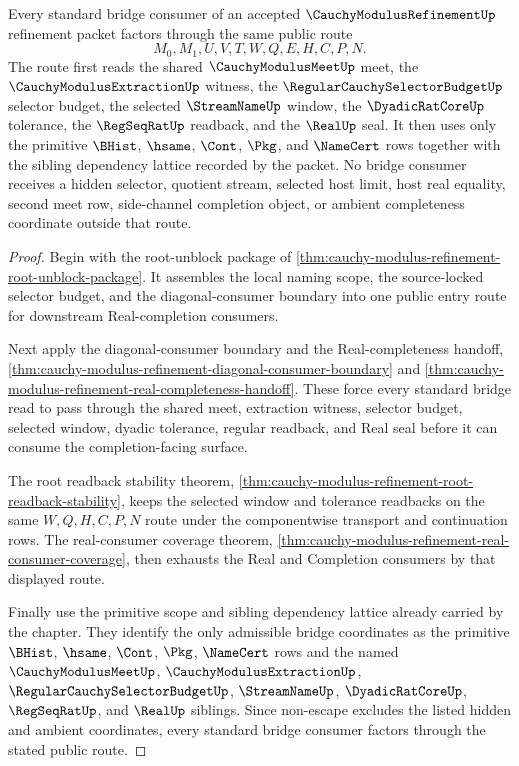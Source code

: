 \begin{theorem}
\label{thm:cauchy-modulus-refinement-bridged-route-surface}
Every standard bridge consumer of an accepted $\CauchyModulusRefinementUp$ refinement packet factors through the same public route
$$
M_0,M_1,U,V,T,W,Q,E,H,C,P,N.
$$
The route first reads the shared $\CauchyModulusMeetUp$ meet, the $\CauchyModulusExtractionUp$ witness, the $\RegularCauchySelectorBudgetUp$ selector budget, the selected $\StreamNameUp$ window, the $\DyadicRatCoreUp$ tolerance, the $\RegSeqRatUp$ readback, and the $\RealUp$ seal. It then uses only the primitive $\BHist$, $\hsame$, $\Cont$, $\Pkg$, and $\NameCert$ rows together with the sibling dependency lattice recorded by the packet. No bridge consumer receives a hidden selector, quotient stream, selected host limit, host real equality, second meet row, side-channel completion object, or ambient completeness coordinate outside that route.
\end{theorem}
\begin{proof}
Begin with the root-unblock package of \autoref{thm:cauchy-modulus-refinement-root-unblock-package}. It assembles the local naming scope, the source-locked selector budget, and the diagonal-consumer boundary into one public entry route for downstream Real-completion consumers.

Next apply the diagonal-consumer boundary and the Real-completeness handoff, \autoref{thm:cauchy-modulus-refinement-diagonal-consumer-boundary} and \autoref{thm:cauchy-modulus-refinement-real-completeness-handoff}. These force every standard bridge read to pass through the shared meet, extraction witness, selector budget, selected window, dyadic tolerance, regular readback, and Real seal before it can consume the completion-facing surface.

The root readback stability theorem, \autoref{thm:cauchy-modulus-refinement-root-readback-stability}, keeps the selected window and tolerance readbacks on the same $W,Q,H,C,P,N$ route under the componentwise transport and continuation rows. The real-consumer coverage theorem, \autoref{thm:cauchy-modulus-refinement-real-consumer-coverage}, then exhausts the Real and Completion consumers by that displayed route.

Finally use the primitive scope and sibling dependency lattice already carried by the chapter. They identify the only admissible bridge coordinates as the primitive $\BHist$, $\hsame$, $\Cont$, $\Pkg$, $\NameCert$ rows and the named $\CauchyModulusMeetUp$, $\CauchyModulusExtractionUp$, $\RegularCauchySelectorBudgetUp$, $\StreamNameUp$, $\DyadicRatCoreUp$, $\RegSeqRatUp$, and $\RealUp$ siblings. Since non-escape excludes the listed hidden and ambient coordinates, every standard bridge consumer factors through the stated public route.
\end{proof}

